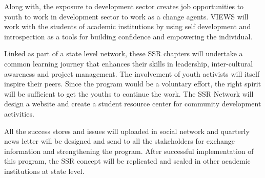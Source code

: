 \documentclass[12pt]{article}
\begin{document}
	\par Along with, the exposure to development sector creates job opportunities to youth to work in development sector to work as a change agents.
	VIEWS will work with the students of academic institutions by using self development and introspection as a tools for building confidence and empowering the individual. \\

	\par Linked as part of a state level network, these SSR chapters will undertake a common learning journey that enhances their skills in leadership, inter-cultural awareness and project management.
	The involvement of youth activists will itself inspire their peers.
	Since the program would be a voluntary effort, the right spirit will be sufficient to get the youths to continue the work.
	The SSR Network will design a website and create a student resource center for community development activities. \\

	\par All the success stores and issues will uploaded in social network and quarterly news letter will be designed and send to all the stakeholders for exchange information and strengthening the program.
	After successful implementation of this program, the SSR concept will be replicated and scaled in other academic institutions at state level.
\end{document}
